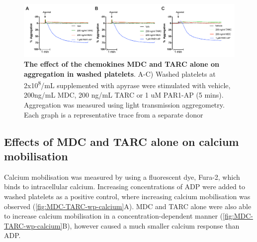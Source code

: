\documentclass[11pt,twoside]{bristolthesis}
\begin{document}
\begin{figure}

{\centering \includegraphics[width=1\linewidth]{figure/Chemokines/Layouts/MDC_TARC_alone_wp_aggregation} 

}

\caption[The effect of the chemokines MDC and TARC alone on aggregation in washed platelets]{\textbf{The effect of the chemokines MDC and TARC alone on aggregation in washed platelets}. A-C) Washed platelets at 2x10\textsuperscript{8}/mL supplemented with apyrase were stimulated with vehicle, 200ng/mL MDC, 200 ng/mL TARC or 1 uM PAR1-AP (5 mins). Aggregation was measured using light transmission aggregometry. Each graph is a representative trace from a separate donor}\label{fig:MDC-TARC-wp-alone-aggregation}
\end{figure}
\hypertarget{effects-of-mdc-and-tarc-alone-on-calcium-mobilisation}{%
\subsection{Effects of MDC and TARC alone on calcium mobilisation}\label{effects-of-mdc-and-tarc-alone-on-calcium-mobilisation}}

Calcium mobilisation was measured by using a fluorescent dye, Fura-2, which binds to intracellular calcium. Increasing concentrations of ADP were added to washed platelets as a positive control, where increasing calcium mobilisation was observed (\ref{fig:MDC-TARC-wp-calcium}A). MDC and TARC alone were also able to increase calcium mobilisation in a concentration-dependent manner (\ref{fig:MDC-TARC-wp-calcium}B), however caused a much smaller calcium response than ADP.
\end{document}
